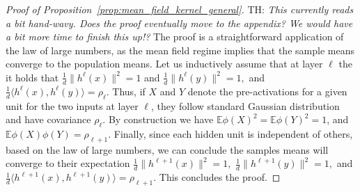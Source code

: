 \documentclass[twoside]{article}
\newcommand{\E}{\mathbb{E}}
\theoremstyle{definition}
\newcommand{\thomas}[1]{{\color{blue}TH:  \textit{#1}}}
\begin{document}
\begin{proof}[Proof of Proposition~\ref{prop:mean_field_kernel_general}]
\thomas{This currently reads a bit hand-wavy. Does the proof eventually move to the appendix? We would have a bit more time to finish this up!?}
 The proof is a straightforward application of the law of large numbers, as the mean field regime implies that the sample means converge to the population means. Let us inductively assume that at layer $\ell$ the it holds that $\frac1d\|h^{\ell}(x)\|^2 = 1$ and $\frac1d\|h^{\ell}(y)\|^2=1,$ and $\frac1d\langle h^{\ell}(x),h^{\ell}(y)\rangle = \rho_{\ell}$. Thus, if $X$ and $Y$ denote the pre-activations for a given unit for the two inputs at layer $\ell$, they follow standard Gaussian distribution and have covariance $\rho_{\ell}.$ By construction we have $\E \phi(X)^2 = \E \phi(Y)^2 = 1$, and $\E \phi(X)\phi(Y) = \rho_{\ell+1}.$ Finally, since each hidden unit is independent of others, based on the law of large numbers, we can conclude the samples means will converge to their expectation $\frac1d \|h^{\ell+1}(x)\|^2 = 1, $ $\frac1d \|h^{\ell+1}(y)\|^2 = 1,$ and $\frac1d \langle h^{\ell+1}(x),h^{\ell+1}(y)\rangle = \rho_{\ell+1}. $ This concludes the proof. 
\end{proof}
\end{document}
